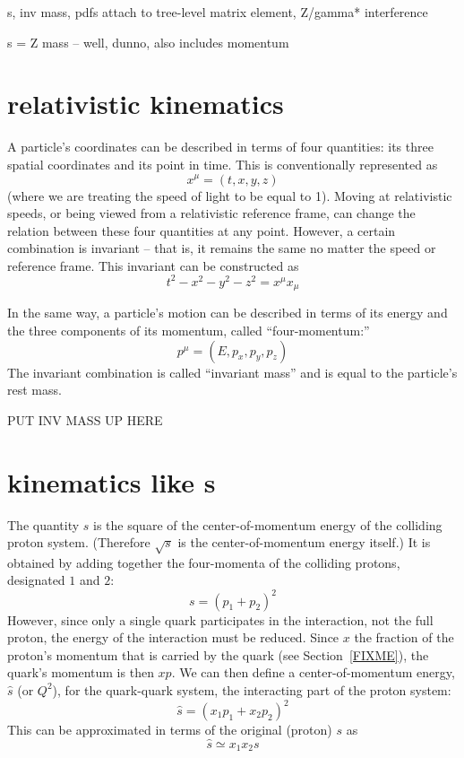 s, inv mass, pdfs attach to tree-level matrix element, 
Z/gamma* interference

s = Z mass -- well, dunno, also includes momentum

\section{relativistic kinematics}

A particle's coordinates can be described in terms of 
four quantities: its three spatial coordinates 
and its point in time.  This is conventionally 
represented as 
\[
x^{\mu} = (t, x, y, z)
\]
(where we are treating the speed of light to be 
equal to 1).  
Moving at relativistic speeds, 
or being viewed from a relativistic reference frame, 
can change the relation between these 
four quantities at any point.  
However, a certain combination is 
invariant -- that is, it remains the same no 
matter the speed or reference frame.  
This invariant can be constructed as 
\[
t^2 - x^2 - y^2 - z^2 = x^{\mu} x_{\mu}
\]

In the same way, a particle's motion can be described 
in terms of its energy and the three components of 
its momentum, called ``four-momentum:''
\[
p^{\mu} = (E, p_x, p_y, p_z)
\]
The invariant combination is called ``invariant mass'' 
and is equal to the particle's rest mass.  


PUT INV MASS UP HERE

\section{kinematics like s}
The quantity $s$ is the square of the center-of-momentum 
energy of the colliding proton system.  
(Therefore $\sqrt{s}$ is the center-of-momentum 
energy itself.)  
It is obtained by adding together the four-momenta 
of the colliding protons, designated $1$ and $2$: %
\[
s = (p_1 + p_2)^2
\]
However, since only a single quark participates 
in the interaction, not the full proton, 
the energy of the interaction must be reduced.  
Since $x$ the fraction of the proton's momentum that is carried 
by the quark (see Section~\ref{FIXME}), %
the 
quark's momentum is then $xp$.  
We can then define a center-of-momentum energy, 
$\hat{s}$ (or $Q^2$), 
for the quark-quark system, 
the interacting part of the proton system: 
\[
\hat{s} = (x_1 p_1 + x_2 p_2)^2
\]
This can be approximated in terms of the original 
(proton) $s$ as 
\[
\hat{s} \simeq x_1 x_2 s
\]





